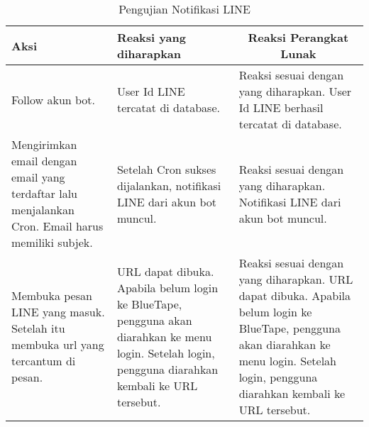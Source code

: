 \begin{itemize}
    \begin{center}
      \begin{table}[H]
        \caption{Pengujian Notifikasi LINE}
        \label{table:pengujian-fungsional-notifikasi-line}
        \begin{tabular}{|p{5cm}|p{5cm}|p{5cm}|}
        \hline
        \centering Aksi	& 	\centering Reaksi yang diharapkan &  \multicolumn{1}{c|}{Reaksi Perangkat Lunak} \\
        \hline
        Follow akun bot. & User Id LINE tercatat di database. & Reaksi sesuai dengan yang diharapkan. User Id LINE berhasil tercatat di database.\\
        \hline 
        Mengirimkan email dengan email yang terdaftar lalu menjalankan Cron. Email harus memiliki subjek. & Setelah Cron sukses dijalankan, notifikasi LINE dari akun bot muncul. & Reaksi sesuai dengan yang diharapkan. Notifikasi LINE dari akun bot muncul. \\
        \hline
        Membuka pesan LINE yang masuk. Setelah itu membuka url yang tercantum di pesan. & URL dapat dibuka. Apabila belum login ke BlueTape, pengguna akan diarahkan ke menu login. Setelah login, pengguna diarahkan kembali ke URL tersebut. & Reaksi sesuai dengan yang diharapkan. URL dapat dibuka. Apabila belum login ke BlueTape, pengguna akan diarahkan ke menu login. Setelah login, pengguna diarahkan kembali ke URL tersebut.  \\
        \hline
        \end{tabular}
    \end{table}
    \end{center}
\end{itemize}



